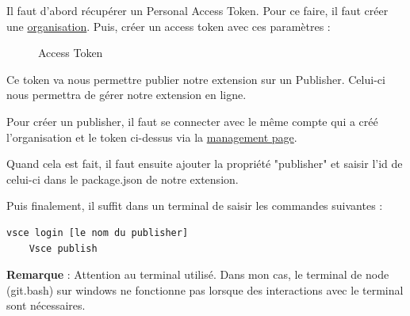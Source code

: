 \documentclass[
    iict, %
    il, %
]{heig-tb}
\begin{document}
Il faut d'abord récupérer un Personal Access Token. Pour ce faire, il faut créer une \href{https://docs.microsoft.com/en-us/azure/devops/organizations/accounts/create-organization?view=azure-devops}{organisation}.
Puis, créer un access token avec ces paramètres :
\begin{figure}[!h]
    \begin{center}
    \end{center}
    \caption[Access Token]{\label{access-token}Access Token}
\end{figure}

Ce token va nous permettre publier notre extension sur un Publisher. Celui-ci nous permettra de gérer notre extension en ligne.

Pour créer un publisher, il faut se connecter avec le même compte qui a créé l'organisation et le token ci-dessus via la \href{https://marketplace.visualstudio.com/manage/publishers/}{management page}.

Quand cela est fait, il faut ensuite ajouter la propriété "publisher" et saisir l'id de celui-ci dans le package.json de notre extension.

Puis finalement, il suffit dans un terminal de saisir les commandes suivantes :
\begin{lstlisting}[frame=single]
    vsce login [le nom du publisher]
    Vsce publish
\end{lstlisting}

\textbf{Remarque} : Attention au terminal utilisé. Dans mon cas, le terminal de node (git.bash) sur windows ne fonctionne pas lorsque des interactions avec le terminal sont nécessaires.
\end{document}
